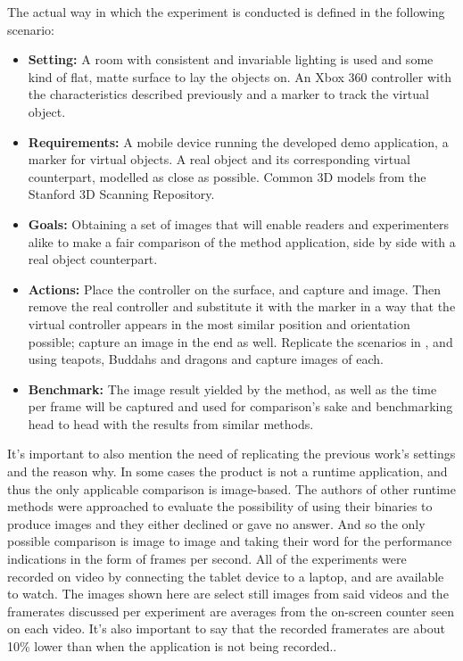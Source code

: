 The actual way in which the experiment is conducted is defined in the following scenario:
\begin{itemize}
    \item \textbf{Setting:} A room with consistent and invariable lighting is used and some kind of flat, matte surface to lay the objects on. An Xbox 360 controller with the characteristics described previously and a marker to track the virtual object.
    \item \textbf{Requirements:} A mobile device running the developed demo application, a marker for virtual objects. A real object and its corresponding virtual counterpart, modelled as close as possible. Common 3D models from the Stanford 3D Scanning Repository.
    \item \textbf{Goals:} Obtaining a set of images that will enable readers and experimenters alike to make a fair comparison of the method application, side by side with a real object counterpart.
    \item \textbf{Actions:} Place the controller on the surface, and capture and image. Then remove the real controller and substitute it with the marker in a way that the virtual controller appears in the most similar position and orientation possible; capture an image in the end as well. Replicate the scenarios in \cite{kanbara2004}, \cite{karsh2014} and \cite{pessoa2011} using teapots, Buddahs and dragons and capture images of each.
     \item \textbf{Benchmark:} The image result yielded by the method, as well as the time per frame will be captured and used for comparison's sake and benchmarking head to head with the results from similar methods.
\end{itemize}

It's important to also mention the need of replicating the previous work's settings and the reason why. In some cases the product is not a runtime application, and thus the only applicable comparison is image-based. The authors of other runtime methods were approached to evaluate the possibility of using their binaries to produce images and they either declined or gave no answer. And so the only possible comparison is image to image and taking their word for the performance indications in the form of frames per second.\newline
All of the experiments were recorded on video by connecting the tablet device to a laptop, and are available to watch. The images shown here are select still images from said videos and the framerates discussed per experiment are averages from the on-screen counter seen on each video. It's also important to say that the recorded framerates are about 10\% lower than when the application is not being recorded.\newline.

